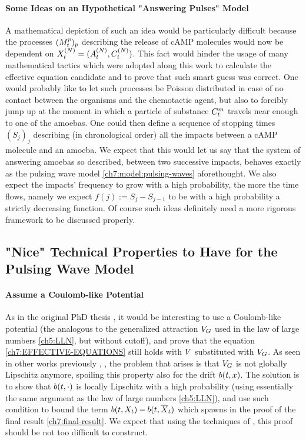 \paragraph{Some Ideas on an Hypothetical "Answering Pulses" Model}
A mathematical depiction of such an idea would be particularly difficult because the processes $(M_t^p)_p$ describing the release of cAMP molecules would now be dependent on $X_t^{(N)} = (A_t^{(N)}, C_t^{(N)})$.
This fact would hinder the usage of many mathematical tactics which were adopted along this work to calculate the effective equation candidate and to prove that such smart guess was correct.
One would probably like to let such processes be Poisson distributed in case of no contact between the organisms and the chemotactic agent, but also to forcibly jump up at the moment in which a particle of substance $C_t^m$ travels near enough to one of the amoebas.
One could then define a sequence of stopping times $(S_j)_j$ describing (in chronological order) all the impacts between a cAMP molecule and an amoeba.
We expect that this would let us say that the system of answering amoebas so described, between two successive impacts, behaves exactly as the pulsing wave model \ref{ch7:model:pulsing-waves} aforethought.
We also expect the impacts' frequency to grow with a high probability, the more the time flows, namely we expect $f(j) := S_j - S_{j-1}$ to be with a high probability a strictly decreasing function.
Of course such ideas definitely need a more rigorous framework to be discussed properly.

\subsection{"Nice" Technical Properties to Have for the Pulsing Wave Model}

	\paragraph{Assume a Coulomb-like Potential}
	As in the original PhD thesis \cite{ana}, it would be interesting to use a Coulomb-like potential (the analogous to the generalized attraction $V_{G}$ used in the law of large numbers \ref{ch5:LLN}, but without cutoff), and prove that the equation \ref{ch7:EFFECTIVE-EQUATIONS} still holds with $V$ substituted with $V_{G}$.
	As seen in other works previously \cite{ana}, \cite{peter-boers}, the problem that arises is that $V_{G}$ is not globally Lipschitz anymore, spoiling this property also for the drift $b(t, x)$.
	The solution is to show that $b(t, \cdot)$ is locally Lipschitz with a high probability (using essentially the same argument as the law of large numbers \ref{ch5:LLN}), and use such condition to bound the term $b(t, X_t) - b(t,\overline{X}_t)$ which spawns in the proof of the final result \ref{ch7:final-result}.
	We expect that using the techniques of \cite{peter-boers}, this proof should be not too difficult to construct.

